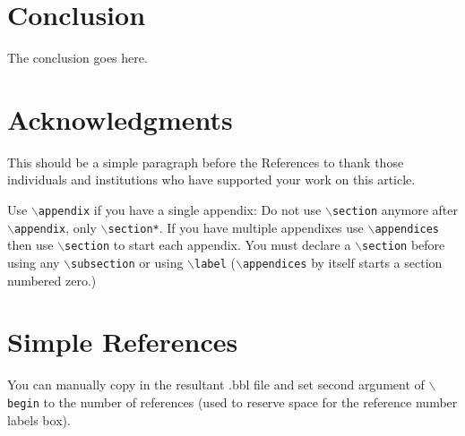 \documentclass[lettersize,journal]{IEEEtran}
\begin{document}
\section{Conclusion}
    The conclusion goes here.


\section*{Acknowledgments}
    This should be a simple paragraph before the References to thank those individuals and
    institutions who have supported your work on this article.



{
    Use $\backslash${\tt{appendix}} if you have a single appendix:
    Do not use $\backslash${\tt{section}} anymore after $\backslash${\tt{appendix}}, only $\backslash${\tt{section*}}.
    If you have multiple appendixes use $\backslash${\tt{appendices}} then use $\backslash${\tt{section}} to start each appendix.
You must declare a $\backslash${\tt{section}} before using any $\backslash${\tt{subsection}} or using $\backslash${\tt{label}} ($\backslash${\tt{appendices}} by itself
 starts a section numbered zero.)}






%
%
%
\section{Simple References}
You can manually copy in the resultant .bbl file and set second argument of $\backslash${\tt{begin}} to the number of references
 (used to reserve space for the reference number labels box).
\end{document}
